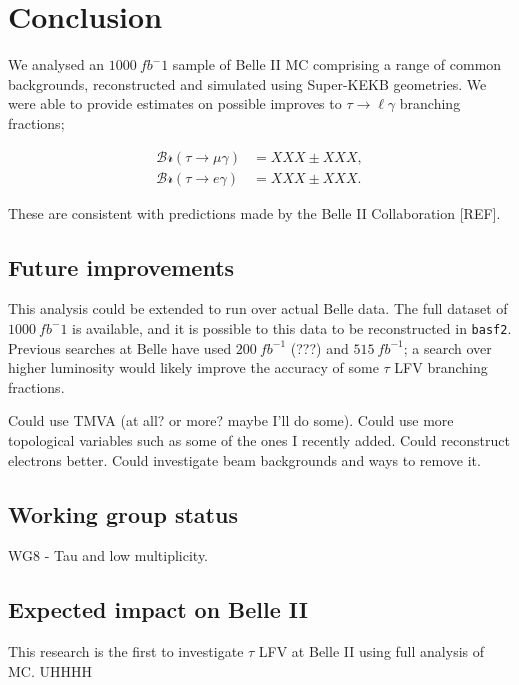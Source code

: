 \documentclass[12pt]{thesis}  %
\begin{document}
\pagebreak


\chapter{Conclusion}

We analysed an $\SI{1000}{fb^-1}$ sample of Belle II MC comprising a range of common backgrounds, reconstructed and simulated using Super-KEKB geometries. We were able to provide estimates on possible improves to $\tau\to\ell\gamma$ branching fractions;

\begin{align}
\mathcal{Br}(\tau\to\mu\gamma) &= XXX \pm XXX,\\
\mathcal{Br}(\tau\to e\gamma) &= XXX \pm XXX.
\end{align}

These are consistent with predictions made by the Belle II Collaboration [REF].


\section{Future improvements}

This analysis could be extended to run over actual Belle data. The full dataset of $\SI{1000}{fb^-1}$ is available, and it is possible to this data to be reconstructed in \texttt{basf2}. Previous searches at Belle have used $\SI{200}{fb^{-1}}$ (???) and $\SI{515}{fb^{-1}}$; a search over higher luminosity would likely improve the accuracy of some $\tau$ LFV branching fractions.

Could use TMVA (at all? or more? maybe I'll do some). Could use more topological variables such as some of the ones I recently added. Could reconstruct electrons better. Could investigate beam backgrounds and ways to remove it.

\section{Working group status}

WG8 - Tau and low multiplicity.

\section{Expected impact on Belle II}

This research is the first to investigate $\tau$ LFV at Belle II using full analysis of MC. UHHHH
\end{document}
